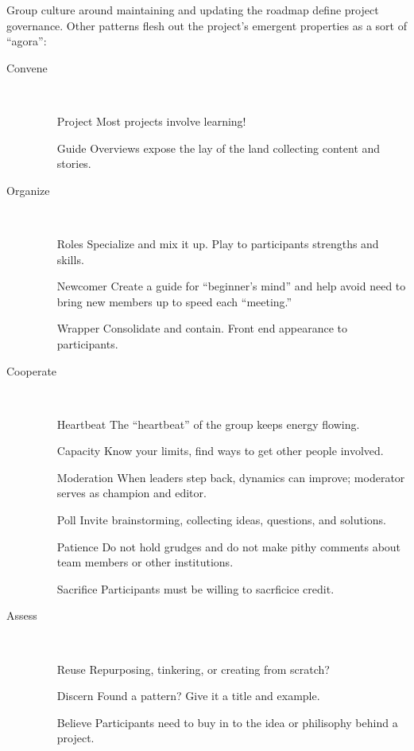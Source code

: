 \documentclass{acm_proc_article-sp}
\begin{document}
Group culture around maintaining and updating the roadmap define project governance. Other patterns flesh out the project's emergent properties as a sort of ``agora'':

\hspace{.2in}
\begin{minipage}{.4\textwidth}
\begin{description}
\item[Convene] \quad \\[-.1in]
\begin{itemize}
\item[Project] Most projects involve learning!
\item[Guide] Overviews expose the lay of the land collecting content
  and stories.
\end{itemize}
\item[Organize] \quad \\[-.1in]
\begin{itemize}
\item[Roles] Specialize and mix it up. Play to participants strengths
  and skills.
\item[Newcomer] Create a guide for ``beginner's mind'' and help avoid
  need to bring new members up to speed each ``meeting.''
\item[Wrapper] Consolidate and contain. Front end appearance to
  participants.
\end{itemize}
\item[Cooperate] \quad \\[-.1in]
\begin{itemize}
\item[Heartbeat] The ``heartbeat'' of the group keeps energy flowing.
\item[Capacity] Know your limits, find ways to get other people
  involved.
\item[Moderation] When leaders step back, dynamics can improve;
  moderator serves as champion and editor.
\item[Poll] Invite brainstorming, collecting ideas, questions, and
  solutions.
\item[Patience] Do not hold grudges and do not make pithy comments
  about team members or other institutions.
\item[Sacrifice] Participants must be willing to sacrficice credit.
\end{itemize}
\item[Assess]  \quad \\[-.1in]
\begin{itemize}
\item[Reuse] Repurposing, tinkering, or creating from scratch?
\item[Discern] Found a pattern? Give it a title and example.
\item[Believe] Participants need to buy in to the idea or philisophy
  behind a project.
\end{itemize}
\end{description}
\end{minipage}
\end{document}
